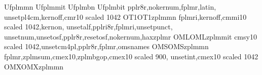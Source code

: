 %
%

%
%
\endrecordtransforms
\endrecordtransforms
%
\installfonts
{}
	{U}{fplm}{m}{n}{}
	{U}{fplm}{m}{it}{}
	{U}{fplm}{b}{n}{}
	{U}{fplm}{b}{it}{}
\endinstallfonts
%
\installfonts
	{pplr8r,nokernum,fplmr,latin,
	unsetpl4cm,kernoff,cmr10 scaled 1042}
	{OT1}{OT1}{zplm}{m}{n}{}
	{fplmri,kernoff,cmmi10 scaled 1042,kernon,
	unsetalf,pplri8r,fplmri,unsetpunct,
	unsetnum,unsetosf,pplr8r,resetosf,nokernum,haxzplmr}
	{OML}{OML}{zplm}{m}{it}{}
	{cmsy10 scaled 1042,unsetcm4pl,pplr8r,fplmr,omsnames}
	{OMS}{OMS}{zplm}{m}{n}{}
	{fplmr,zplmsum,cmex10,zplmbgop,cmex10 scaled 900,
	unsetint,cmex10 scaled 1042}
	{OMX}{OMX}{zplm}{m}{n}{}
